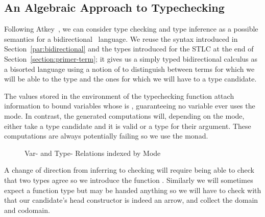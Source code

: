 \subsection{An Algebraic Approach to Typechecking}\label{section:typechecking}

Following Atkey~\citeyear{atkey2015algebraic}, we can consider type checking
and type inference as a possible semantics for a bidirectional~\cite{pierce2000local}
language. We reuse the syntax introduced in Section~\ref{par:bidirectional}
and the types introduced for the STLC at the end of Section~\ref{section:primer-term}; it
gives us a simply typed bidirectional calculus as a bisorted language using
a notion of  to distinguish between terms for which we will be able to
 the type and the ones for which we will have to  a type
candidate.

The values stored in the environment of the typechecking function attach 
information to bound variables whose  is , guaranteeing no
variable ever uses the  mode. In contrast, the generated computations
will, depending on the mode, either take a type candidate and  it is
valid or  a type for their argument. These computations are always
potentially failing so we use the  monad.

\begin{figure}[h]
\begin{minipage}[t]{0.40\textwidth}
\end{minipage}\hfill
\begin{minipage}[t]{0.50\textwidth}
\end{minipage}
\caption{Var- and Type- Relations indexed by Mode}
\end{figure}

A change of direction from inferring to checking will require being able to check
that two types agree so we introduce the function . Similarly we will
sometimes expect a function type but may be handed anything so we will have to check
with  that our candidate's head constructor is indeed an arrow, and
collect the domain and codomain.

